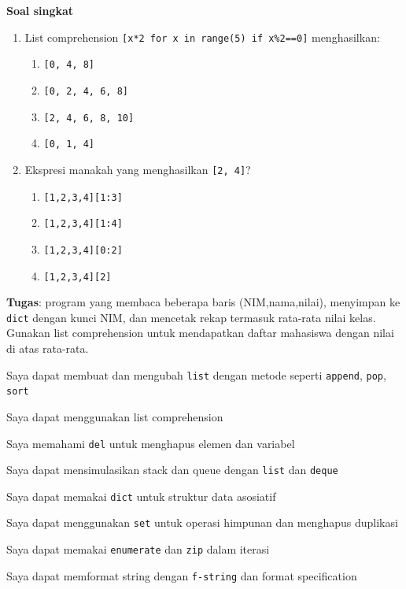 \documentclass[../main.tex]{subfiles}
\begin{document}
\begin{asesmen}
\textbf{Soal singkat}

\begin{enumerate}
  \item List comprehension \texttt{[x*2 for x in range(5) if x\%2==0]} menghasilkan:
  \begin{enumerate}
    \item \texttt{[0, 4, 8]}
    \item \texttt{[0, 2, 4, 6, 8]}
    \item \texttt{[2, 4, 6, 8, 10]}
    \item \texttt{[0, 1, 4]}
  \end{enumerate}
  \item Ekspresi manakah yang menghasilkan \texttt{[2, 4]}?
  \begin{enumerate}
    \item \texttt{[1,2,3,4][1:3]}
    \item \texttt{[1,2,3,4][1:4]}
    \item \texttt{[1,2,3,4][0:2]}
    \item \texttt{[1,2,3,4][2]}
  \end{enumerate}
\end{enumerate}

\textbf{Tugas}: program yang membaca beberapa baris (NIM,nama,nilai), menyimpan ke \texttt{dict} dengan kunci NIM, dan mencetak rekap termasuk rata-rata nilai kelas. Gunakan list comprehension untuk mendapatkan daftar mahasiswa dengan nilai di atas rata-rata.
\end{asesmen}

\begin{checklist}
  \item Saya dapat membuat dan mengubah \texttt{list} dengan metode seperti \texttt{append}, \texttt{pop}, \texttt{sort}
  \item Saya dapat menggunakan list comprehension
  \item Saya memahami \texttt{del} untuk menghapus elemen dan variabel
  \item Saya dapat mensimulasikan stack dan queue dengan \texttt{list} dan \texttt{deque}
  \item Saya dapat memakai \texttt{dict} untuk struktur data asosiatif
  \item Saya dapat menggunakan \texttt{set} untuk operasi himpunan dan menghapus duplikasi
  \item Saya dapat memakai \texttt{enumerate} dan \texttt{zip} dalam iterasi
  \item Saya dapat memformat string dengan \texttt{f-string} dan format specification
\end{checklist}
\end{document}

